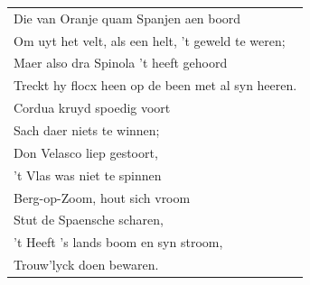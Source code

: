 \documentclass{article}
\begin{document}
\begin{flushleft}
\begin{tabularx}{0.8\textwidth} {
   >{\raggedright\arraybackslash}X}
   Die van Oranje quam Spanjen aen boord\\
Om uyt het velt, als een helt, ’t geweld te weren;\\
Maer also dra Spinola ’t heeft gehoord\\
Treckt hy flocx heen op de been met al syn heeren.\\
Cordua kruyd spoedig voort\\
Sach daer niets te winnen;\\
Don Velasco liep gestoort,\\
’t Vlas was niet te spinnen\\
Berg-op-Zoom, hout sich vroom\\
Stut de Spaensche scharen,\\
’t Heeft ’s lands boom en syn stroom,\\
Trouw’lyck doen bewaren.\\
\end{tabularx}
\end{flushleft}
\end{document}
